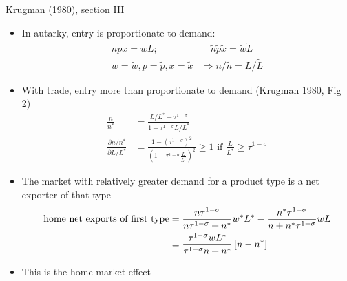 \documentclass[10pt,notes=hide]{beamer}
\begin{document}
\begin{frame}{Krugman (1980), section III}
\linespread{1.0}
\begin{itemize}
	\item In autarky, entry is proportionate to demand:
	\begin{align*}
	npx = wL; & \quad \tilde{n}\tilde{p}\tilde{x} = \tilde{w}\tilde{L} \\
	w=\tilde{w}, p=\tilde{p}, x=\tilde{x} & \Rightarrow n/\tilde{n} = L / \tilde{L}
	\end{align*}
	\item With trade, entry more than proportionate to demand (Krugman 1980, Fig 2)
	\begin{align*}
	\frac{n}{n^*} &= \frac{L/L^* - \tau^{1-\sigma}}{1 - \tau^{1-\sigma}L/L^*} \\
	\frac{\partial n/n^*}{\partial L/L^*} &= \frac{1 - \left(\tau^{1-\sigma} \right)^2}{\left(1 - \tau^{1-\sigma}\frac{L}{L^*}\right)^2} \geq 1 \text{ if } \frac{L}{L^*}\geq \tau^{1-\sigma}
	\end{align*}
	\item The market with relatively greater demand for a product type is a net exporter of that type
	\begin{align*}
	\textnormal{home net exports of first type}	&=  \frac{n\tau^{1-\sigma}}{n\tau^{1-\sigma} + n^*} w^* L^*  - \frac{n^*\tau^{1-\sigma}}{n + n^*\tau^{1-\sigma}} w L \\
				&= \frac{\tau^{1-\sigma}wL^*}{\tau^{1-\sigma}n+n^*} \left[n - n^*\right]
	\end{align*}
	\item This is the home-market effect
\end{itemize}
\end{frame}
%
\end{document}
